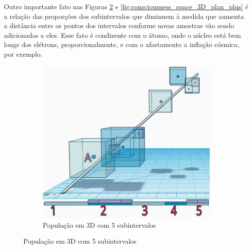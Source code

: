 Outro importante fato nas Figuras \ref{fig:consciousness_space_3D_plan} e \ref{fig:consciousness_space_3D_plan_plus}  é a relação das proporções dos subintervalos que diminuem à medida que aumenta a distância entre os pontos dos intervalos conforme novas amostras vão sendo adicionadas a eles. Esse fato é condizente com o átomo, onde o núcleo está bem longe dos elétrons, proporcionalmente, e com o afastamento a inflação cósmica, por exemplo. 
	\begin{figure}[H]
	\centering
		\begin{subfigure}[H]{0.65\linewidth}
		\centering
		\includegraphics[width=1\linewidth]{sections/images/consciousness_space_3D_plan.jpg}
		\caption{População em 3D com 5 subintervalos}
		\label{fig:consciousness_space_3D_plan}
		\end{subfigure}
	

\end{figure}
